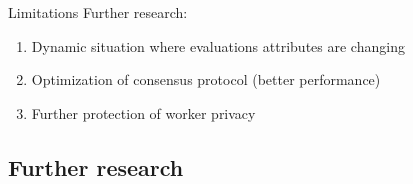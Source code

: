 \begin{frame}{Limitations}
	Further research:
  \begin{enumerate}
  \item Dynamic situation where evaluations attributes are changing
  \item Optimization of consensus protocol (better performance)
  \item Further protection of worker privacy
  \end{enumerate}
\end{frame}

\subsection{Further research}